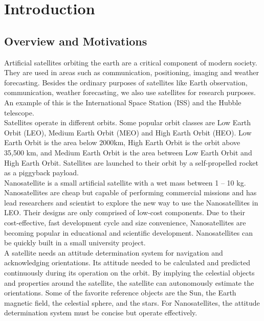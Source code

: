 
\chapter{Introduction}
\label{chap:intro}

\section{Overview and Motivations}

Artificial satellites orbiting the earth are a critical component of modern society. They are used in areas such as communication, positioning, imaging and weather forecasting. Besides the ordinary purposes of satellites like Earth observation, communication, weather forecasting\cite{How_satellites_rule_our_world}, we also use satellites for research purposes. An example of this is the International Space Station (ISS) and the Hubble telescope. \\

\noindent Satellites operate in different orbits. Some popular orbit classes are Low Earth Orbit (LEO), Medium Earth Orbit (MEO) and High Earth Orbit (HEO)\cite{sat_wiki}. Low Earth Orbit is the area below 2000km, High Earth Orbit is the orbit above 35,500 km, and Medium Earth Orbit is the area between Low Earth Orbit and High Earth Orbit. Satellites are launched to their orbit by a self-propelled rocket as a piggyback payload. \\

\noindent Nanosatellite is a small artificial satellite with a wet mass between 1 – 10 kg. Nanosatellites are cheap but capable of performing commercial missions and has lead researchers and scientist to explore the new way to use the Nanosatellites in LEO\cite{network}. Their designs are only comprised of low-cost components. Due to their cost-effective, fast development cycle and size convenience, Nanosatellites are becoming popular in educational and scientific development. Nanosatellites can be quickly built in a small university project. \\

\noindent A satellite needs an attitude determination system for navigation and acknowledging orientations. Its attitude needed to be calculated and predicted continuously during its operation on the orbit. By implying the celestial objects and properties around the satellite, the satellite can autonomously estimate the orientations. Some of the favorite reference objects are the Sun, the Earth magnetic field, the celestial sphere, and the stars. For Nanosatellites, the attitude determination system must be concise but operate effectively.

